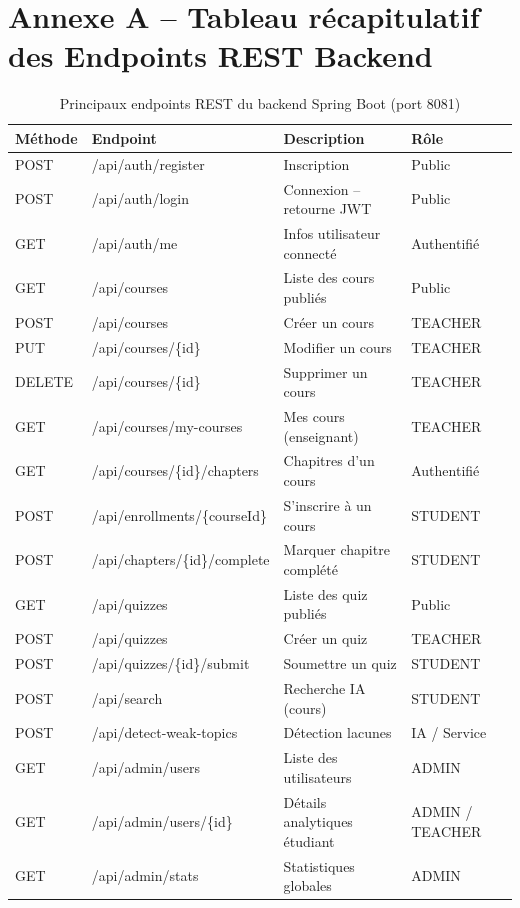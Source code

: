 \documentclass[12pt,a4paper]{report}
\begin{document}
\newpage

\appendix

\chapter{Annexe A -- Tableau récapitulatif des Endpoints REST Backend}

\begin{table}[H]
\centering
\renewcommand{\arraystretch}{1.25}
\caption{Principaux endpoints REST du backend Spring Boot (port 8081)}
\vspace{0.2cm}
\begin{tabularx}{\textwidth}{l l X l}
\toprule
\textbf{Méthode} & \textbf{Endpoint} & \textbf{Description} & \textbf{Rôle} \\
\midrule
POST & /api/auth/register & Inscription & Public \\
POST & /api/auth/login & Connexion -- retourne JWT & Public \\
GET  & /api/auth/me & Infos utilisateur connecté & Authentifié \\
\midrule
GET  & /api/courses & Liste des cours publiés & Public \\
POST & /api/courses & Créer un cours & TEACHER \\
PUT  & /api/courses/\{id\} & Modifier un cours & TEACHER \\
DELETE & /api/courses/\{id\} & Supprimer un cours & TEACHER \\
GET  & /api/courses/my-courses & Mes cours (enseignant) & TEACHER \\
\midrule
GET  & /api/courses/\{id\}/chapters & Chapitres d'un cours & Authentifié \\
POST & /api/enrollments/\{courseId\} & S'inscrire à un cours & STUDENT \\
POST & /api/chapters/\{id\}/complete & Marquer chapitre complété & STUDENT \\
\midrule
GET  & /api/quizzes & Liste des quiz publiés & Public \\
POST & /api/quizzes & Créer un quiz & TEACHER \\
POST & /api/quizzes/\{id\}/submit & Soumettre un quiz & STUDENT \\
\midrule
POST & /api/search & Recherche IA (cours) & STUDENT \\
POST & /api/detect-weak-topics & Détection lacunes & IA / Service \\
GET  & /api/admin/users & Liste des utilisateurs & ADMIN \\
GET  & /api/admin/users/\{id\} & Détails analytiques étudiant & ADMIN / TEACHER \\
GET  & /api/admin/stats & Statistiques globales & ADMIN \\
\bottomrule
\end{tabularx}
\end{table}
\end{document}
